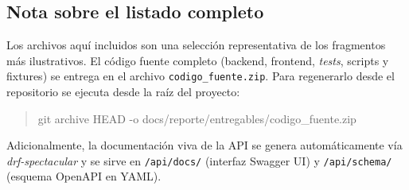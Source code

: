 \subsection{Nota sobre el listado completo}

Los archivos aquí incluidos son una selección representativa de los fragmentos más ilustrativos. El código fuente completo (backend, frontend, \emph{tests}, scripts y fixtures) se entrega en el archivo \texttt{codigo\_fuente.zip}. Para regenerarlo desde el repositorio se ejecuta desde la raíz del proyecto:

\begin{quote}
\ttfamily git archive HEAD -o docs/reporte/entregables/codigo\_fuente.zip
\end{quote}

Adicionalmente, la documentación viva de la API se genera automáticamente vía \emph{drf-spectacular} y se sirve en \texttt{/api/docs/} (interfaz Swagger UI) y \texttt{/api/schema/} (esquema OpenAPI en YAML).
